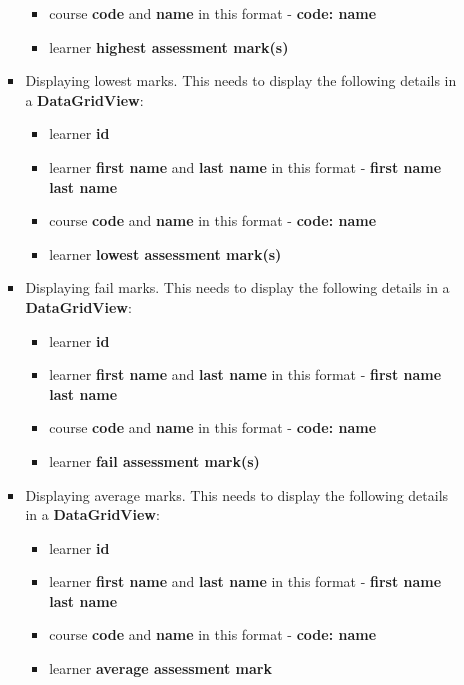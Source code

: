 \documentclass{article}
\begin{document}
\begin{itemize}
\begin{itemize}
\begin{itemize}
\begin{itemize}
                \item course \textbf{code} and \textbf{name} in this format - \textbf{code: name}
                \item learner \textbf{highest assessment mark(s)}
            \end{itemize}
            \item Displaying lowest marks. This needs to display the following details in a \textbf{DataGridView}:
            \begin{itemize}
                \item learner \textbf{id}
                \item learner \textbf{first name} and \textbf{last name} in this format - \textbf{first name last name}
                \item course \textbf{code} and \textbf{name} in this format - \textbf{code: name}
                \item learner \textbf{lowest assessment mark(s)}
            \end{itemize}
            \item Displaying fail marks. This needs to display the following details in a \textbf{DataGridView}:
            \begin{itemize}
                \item learner \textbf{id}
                \item learner \textbf{first name} and \textbf{last name} in this format - \textbf{first name last name}
                \item course \textbf{code} and \textbf{name} in this format - \textbf{code: name}
                \item learner \textbf{fail assessment mark(s)}
            \end{itemize}
            \item Displaying average marks. This needs to display the following details in a \textbf{DataGridView}:
            \begin{itemize}
                \item learner \textbf{id}
                \item learner \textbf{first name} and \textbf{last name} in this format - \textbf{first name last name}
                \item course \textbf{code} and \textbf{name} in this format - \textbf{code: name}
                \item learner \textbf{average assessment mark}
            \end{itemize}

\end{itemize}
\end{itemize}
\end{itemize}
\end{document}
